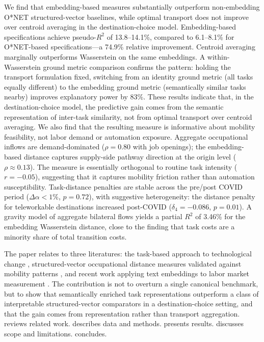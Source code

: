 \documentclass[12pt]{article}
\begin{document}
We find that embedding-based measures substantially outperform non-embedding O*NET structured-vector baselines, while optimal transport does not improve over centroid averaging in the destination-choice model. Embedding-based specifications achieve pseudo-$R^2$ of 13.8--14.1\%, compared to 6.1--8.1\% for O*NET-based specifications---a 74.9\% relative improvement. Centroid averaging marginally outperforms Wasserstein on the same embeddings. A within-Wasserstein ground metric comparison confirms the pattern: holding the transport formulation fixed, switching from an identity ground metric (all tasks equally different) to the embedding ground metric (semantically similar tasks nearby) improves explanatory power by 83\%. These results indicate that, in the destination-choice model, the predictive gain comes from the semantic representation of inter-task similarity, not from optimal transport over centroid averaging. We also find that the resulting measure is informative about mobility feasibility, not labor demand or automation exposure. Aggregate occupational inflows are demand-dominated ($\rho = 0.80$ with job openings); the embedding-based distance captures supply-side pathway direction at the origin level ($\rho \approx 0.13$). The measure is essentially orthogonal to routine task intensity ($r = -0.05$), suggesting that it captures mobility friction rather than automation susceptibility. Task-distance penalties are stable across the pre/post COVID period ($\Delta\alpha < 1\%$, $p = 0.72$), with suggestive heterogeneity: the distance penalty for teleworkable destinations increased post-COVID ($\delta_4 = -0.086$, $p = 0.01$). A gravity model of aggregate bilateral flows yields a partial $R^2$ of 3.46\% for the embedding Wasserstein distance, close to the \citet{CortesGallipoli2018} finding that task costs are a minority share of total transition costs.

The paper relates to three literatures: the task-based approach to technological change \citep{AutorLevyMurnane2003,AcemogluAutor2011}, structured-vector occupational distance measures validated against mobility patterns \citep{GathmannSchonberg2010,CortesGallipoli2018,MouwEtAl2024,SchuStanTaska2024}, and recent work applying text embeddings to labor market measurement \citep{ZhangEtAl2021,DecorteEtAl2022,HampoleEtAl2025}. The contribution is not to overturn a single canonical benchmark, but to show that semantically enriched task representations outperform a class of interpretable structured-vector comparators in a destination-choice setting, and that the gain comes from representation rather than transport aggregation.  reviews related work.  describes data and methods.  presents results.  discusses scope and limitations.  concludes.
\end{document}
